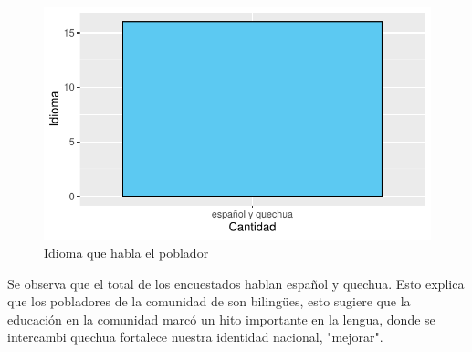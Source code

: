 \documentclass[12pt]{article}\usepackage[]{graphicx}\usepackage[]{xcolor}
\makeatletter
\def\maxwidth{ %
  \ifdim\Gin@nat@width>\linewidth
    \linewidth
  \else
    \Gin@nat@width
  \fi
}
\newenvironment{knitrout}{}{} %
\makeatother
\begin{document}
	\begin{figure}[H]
	\centering
\begin{knitrout}
\color{fgcolor}
\includegraphics[width=\maxwidth]{figure/cinco-1} 
\end{knitrout}
	\caption{Idioma que habla el poblador}
	\end{figure}
	Se observa que el total de los encuestados hablan español y quechua. Esto explica que los pobladores de la comunidad de \comunidad son bilingües, esto sugiere que la educación en la comunidad marcó un hito importante en la lengua, donde se intercambi quechua fortalece nuestra identidad nacional,  "mejorar".
\end{document}
